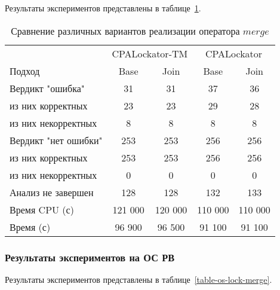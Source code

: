 Результаты экспериментов представлены в таблице~\ref{table-drivers-lock-merge}.

\begin{center}
  \begin{table}[h]\footnotesize
  	\label{table-drivers-lock-merge}
    \caption{Сравнение различных вариантов реализации оператора $merge$}
    \begin{tabular}{ | l | c | c | c | c | }
      \hline
      		& 		\multicolumn{2}{|c|}{CPALockator-TM} 	& \multicolumn{2}{|c|}{CPALockator}  \\
      Подход         				& Base 		& Join 		& Base 		& Join   	\\ \hline
      Вердикт "ошибка" 				& 31   		& 31   		& 37   		& 36   		\\ 
  \hspace{0.5cm} из них корректных 	& 23 		& 23 		& 29   		& 28     	\\ 
  \hspace{0.5cm} из них некорректных & 8 		& 8 		& 8   		& 8     	\\ \hline
      Вердикт "нет ошибки"  		& 253    	& 253   	& 256    	& 256      	\\ 
  \hspace{0.5cm} из них корректных 	& 253 		& 253   	& 256    	& 256     	\\
  \hspace{0.5cm} из них некорректных & 0 		& 0    		& 0     	& 0  		\\ \hline
      Анализ не завершен       		& 128    	& 128   	& 132    	& 133     	\\ \hline
      Время CPU (с)   				& 121 000 	& 120 000 	& 110 000 	& 110 000   \\ 
      Время (с)  					& 96 900 	& 96 500 	& 91 100 	& 91 100 	\\
      \hline
    \end{tabular}
  \end{table}
\end{center}

\subsubsection{Результаты экспериментов на ОС РВ}

Результаты экспериментов представлены в таблице~\ref{table-os-lock-merge}.

